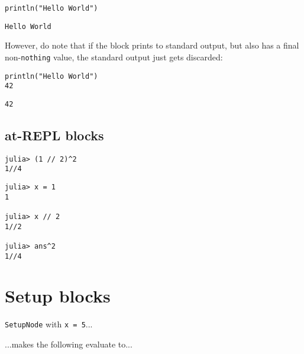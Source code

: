 \begin{verbatim}
println("Hello World")
\end{verbatim}


\begin{verbatim}
Hello World
\end{verbatim}



However, do note that if the block prints to standard output, but also has a final non-\texttt{nothing} value, the standard output just gets discarded:




\begin{verbatim}
println("Hello World")
42
\end{verbatim}


\begin{verbatim}
42
\end{verbatim}



\subsection{at-REPL blocks}



\label{9794080512499797594}{}



\begin{verbatim}
julia> (1 // 2)^2
1//4
\end{verbatim}




\begin{verbatim}
julia> x = 1
1

julia> x // 2
1//2

julia> ans^2
1//4
\end{verbatim}



\section{Setup blocks}



\label{5969831508618549664}{}


\texttt{SetupNode} with \texttt{x = 5}...





...makes the following evaluate to...




